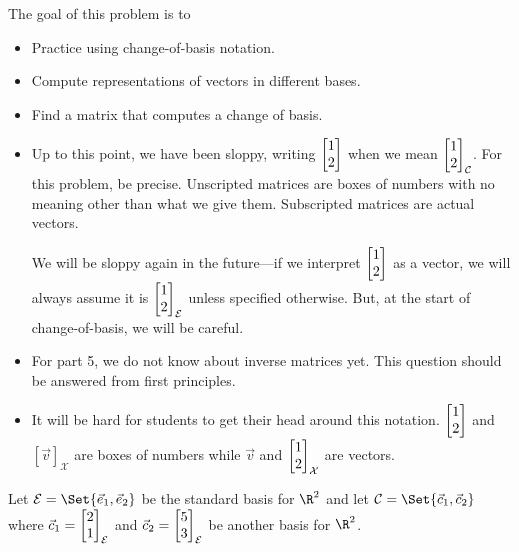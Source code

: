 \documentclass{problemset}
\newcommand{\displayonlynewpage}{\begin{displayonly}\newpage\end{displayonly}}
\begin{document}
	\question
	\begin{annotation}
		\begin{goals}

			The goal of this problem is to
		\displayonlynewpage
			\begin{itemize}
				\item Practice using change-of-basis notation.
				\item Compute representations of vectors in different bases.
				\item Find a matrix that computes a change of basis.
			\end{itemize}
		\end{goals}

		\begin{notes}
			\begin{itemize}
				\item Up to this point, we have been sloppy, writing $\mat{1\\2}$ when
					we mean $\mat{1\\2}_{\mathcal C}$. For this problem, be precise.
					Unscripted matrices are boxes of numbers with no meaning other
					than what we give them. Subscripted matrices are actual vectors.

					We will be sloppy again in the future---if we interpret $\mat{1\\2}$
					as a vector, we will always assume it is $\mat{1\\2}_{\mathcal E}$ unless
					specified otherwise. But, at the start of change-of-basis, we will be careful.
				\item For part 5, we do not know about inverse matrices yet. This question should
					be answered from first principles.
				\item It will be hard for students to get their head around this notation. $\mat{1\\2}$ and $[\vec v]_{\mathcal X}$
					are boxes of numbers while $\vec v$ and $\mat{1\\2}_{\mathcal X}$ are vectors.
			\end{itemize}
		\end{notes}
	\end{annotation}
	Let $\mathcal E=\Set{\xhat,\yhat}$ be the standard basis for $\R^2$ and
	let $\mathcal C=\Set{\vec c_1,\vec c_2}$ where $\vec c_1=\mat{2\\1}_{\mathcal E}$
	and $\vec c_2=\mat{5\\3}_{\mathcal E}$ be another basis for $\R^2$.
\end{document}
